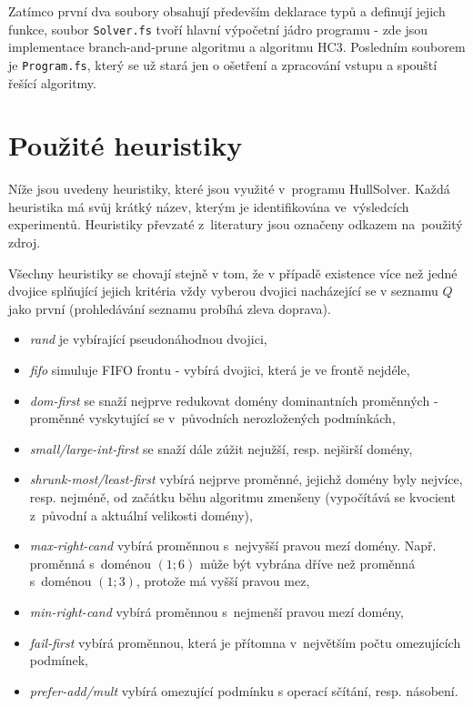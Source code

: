 Zatímco první dva soubory obsahují především deklarace typů a definují jejich funkce, soubor \verb|Solver.fs| tvoří hlavní výpočetní jádro programu - zde jsou implementace branch-and-prune algoritmu a algoritmu HC3. Posledním souborem je \verb|Program.fs|, který se už stará jen o ošetření a zpracování vstupu a spouští řešící algoritmy.

\section{Použité heuristiky}
\label{ch:usedHeuristics}
Níže jsou uvedeny heuristiky, které jsou využité v~programu HullSolver. Každá heuristika má svůj krátký název, kterým je identifikována ve~výsledcích experimentů. Heuristiky převzaté z~literatury jsou označeny odkazem na~použitý zdroj.

Všechny heuristiky se chovají stejně v tom, že v případě existence více než jedné dvojice splňující jejich kritéria vždy vyberou dvojici nacházející se v seznamu $Q$ jako první (prohledávání seznamu probíhá zleva doprava).

\begin{itemize}
  \item \emph{rand} je  vybírající pseudonáhodnou dvojici,
  \item \emph{fifo} simuluje FIFO frontu - vybírá dvojici, která je ve frontě nejdéle,
  \item \emph{dom-first} \cite{feiten10} se snaží nejprve redukovat domény dominantních proměnných - proměnné vyskytující se v~původních nerozložených podmínkách,
  \item \emph{small/large-int-first} \cite{feiten10} se snaží dále zúžit nejužší, resp. nejširší domény,
  \item \emph{shrunk-most/least-first} \cite{feiten10} vybírá nejprve proměnné, jejichž domény byly nejvíce, resp. nejméně, od začátku běhu algoritmu zmenšeny (vypočítává se kvocient z~původní a aktuální velikosti domény),
  \item \emph{max-right-cand} \cite{feiten10} vybírá proměnnou s~nejvyšší pravou mezí domény. Např. proměnná s~doménou $(1;6)$ může být vybrána dříve než proměnná s~doménou $(1;3)$, protože má vyšší pravou mez,
  \item \emph{min-right-cand} \cite{feiten10} vybírá proměnnou s~nejmenší pravou mezí domény,
  \item \emph{fail-first} vybírá proměnnou, která je přítomna v~největším počtu omezujících podmínek,
  \item \emph{prefer-add/mult} vybírá omezující podmínku s operací sčítání, resp. násobení.
\end{itemize}

